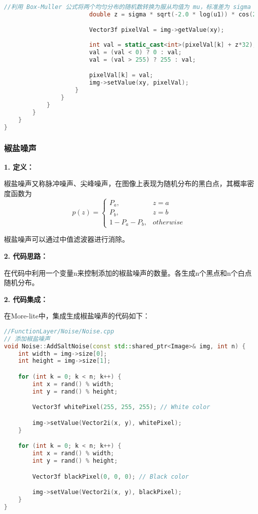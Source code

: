 \documentclass[lang=cn,10pt]{elegantbook}
\begin{document}
\begin{lstlisting}[language=c++]
                        //利用 Box-Muller 公式将两个均匀分布的随机数转换为服从均值为 mu，标准差为 sigma 的高斯分布的随机数 z
                        double z = sigma * sqrt(-2.0 * log(u1)) * cos(2 * PI * u2) + mu;

                        Vector3f pixelVal = img->getValue(xy);
                        
                        int val = static_cast<int>(pixelVal[k] + z*32);
                        val = (val < 0) ? 0 : val;
                        val = (val > 255) ? 255 : val;

                        pixelVal[k] = val;
                        img->setValue(xy, pixelVal);
                    }
                }
            }
        }
    }   
}
\end{lstlisting}

\subsubsection{椒盐噪声}
\textcolor{third}{\textbf{1. 定义：}}

椒盐噪声又称脉冲噪声、尖峰噪声，在图像上表现为随机分布的黑白点，其概率密度函数为
\begin{equation}\label{eu_eqn}
p(z)=
\begin{cases}
P_a, & z=a \\
P_b, & z=b \\
1-P_a-P_b, & otherwise
\end{cases}
\end{equation}

椒盐噪声可以通过中值滤波器进行消除。

\textcolor{third}{\textbf{2. 代码思路：}}

在代码中利用一个变量n来控制添加的椒盐噪声的数量。各生成n个黑点和n个白点随机分布。

\textcolor{third}{\textbf{2. 代码集成：}}

在More-lite中，集成生成椒盐噪声的代码如下：
\begin{lstlisting}[language=c++]
//FunctionLayer/Noise/Noise.cpp
// 添加椒盐噪声
void Noise::AddSaltNoise(const std::shared_ptr<Image>& img, int n) {
    int width = img->size[0];
    int height = img->size[1];

    for (int k = 0; k < n; k++) {
        int x = rand() % width;
        int y = rand() % height;

        Vector3f whitePixel(255, 255, 255); // White color

        img->setValue(Vector2i(x, y), whitePixel);
    }

    for (int k = 0; k < n; k++) {
        int x = rand() % width;
        int y = rand() % height;

        Vector3f blackPixel(0, 0, 0); // Black color

        img->setValue(Vector2i(x, y), blackPixel);
    }
}
\end{lstlisting}
\end{document}
